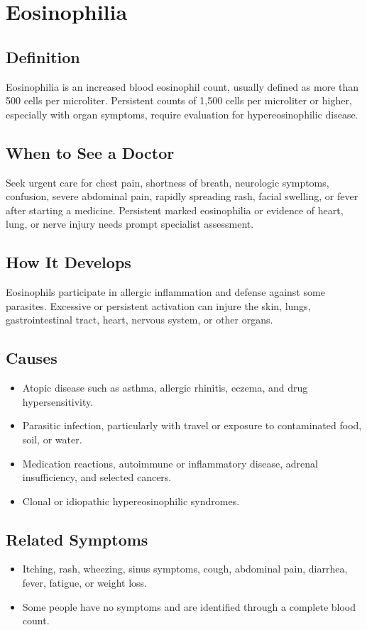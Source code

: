 \chapter{Eosinophilia}

\section*{Definition}
Eosinophilia is an increased blood eosinophil count, usually defined as more than 500 cells per microliter. Persistent counts of 1,500 cells per microliter or higher, especially with organ symptoms, require evaluation for hypereosinophilic disease.

\section*{When to See a Doctor}
Seek urgent care for chest pain, shortness of breath, neurologic symptoms, confusion, severe abdominal pain, rapidly spreading rash, facial swelling, or fever after starting a medicine. Persistent marked eosinophilia or evidence of heart, lung, or nerve injury needs prompt specialist assessment.

\section*{How It Develops}
Eosinophils participate in allergic inflammation and defense against some parasites. Excessive or persistent activation can injure the skin, lungs, gastrointestinal tract, heart, nervous system, or other organs.

\section*{Causes}
\begin{itemize}
  \item Atopic disease such as asthma, allergic rhinitis, eczema, and drug hypersensitivity.
  \item Parasitic infection, particularly with travel or exposure to contaminated food, soil, or water.
  \item Medication reactions, autoimmune or inflammatory disease, adrenal insufficiency, and selected cancers.
  \item Clonal or idiopathic hypereosinophilic syndromes.
\end{itemize}

\section*{Related Symptoms}
\begin{itemize}
  \item Itching, rash, wheezing, sinus symptoms, cough, abdominal pain, diarrhea, fever, fatigue, or weight loss.
  \item Some people have no symptoms and are identified through a complete blood count.
\end{itemize}

